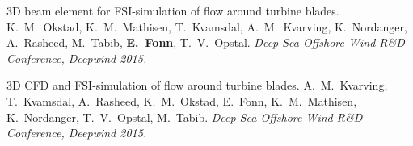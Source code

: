\documentclass[line,margin]{res}
\begin{document}
\begin{resume}
3D beam element for FSI-simulation of flow around turbine blades.
K.~M.~Okstad, K.~M.~Mathisen, T.~Kvamsdal, A.~M.~Kvarving, K.~Nordanger,
A.~Rasheed, M.~Tabib, {\bf E.~Fonn}, T.~V.~Opstal.
{\em {} Deep Sea Offshore Wind R\&D Conference, Deepwind 2015.}

3D CFD and FSI-simulation of flow around turbine blades.
A.~M.~Kvarving, T.~Kvamsdal, A.~Rasheed, K.~M.~Okstad, E.~Fonn, K.~M.~Mathisen,
K.~Nordanger, T.~V.~Opstal, M.~Tabib.
{\em {} Deep Sea Offshore Wind R\&D Conference, Deepwind 2015.}


\end{resume}
\end{document}
